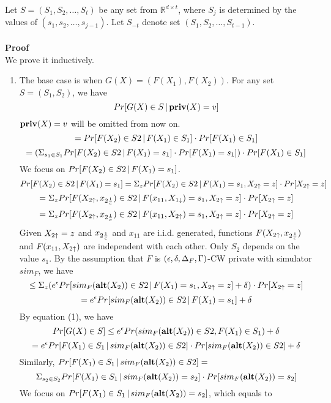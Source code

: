 \documentclass[11pt]{article}
\begin{document}
Let $S=(S_{1}, S_{2}, \dots, S_{t} )$ be any set from $\mathbb {R} ^{d \times t}$, where $S_{j}$ is determined by the values of $(s_{1}, s_{2} , \dots, s_{j-1})$. Let $S_{-t}$ denote set $(S_{1}, S_{2}, \dots, S_{t-1} )$.
\\
\\
{\bf Proof}\\
We prove it inductively. 
\begin{enumerate}
\item The base case is when $G(X) = (F(X_{1}) , F(X_{2}))$. For any set $S= (S_{1}, S_{2})$, we have
\[
Pr[G(X) \in S\,|\, {\bf priv}(X) = v ]
\]
${\bf priv}(X) =v$ will be omitted from now on.
\[
=Pr[F(X_{2}) \in S{2}\,|\, F(X_{1}) \in S_{1}] \cdot Pr[F(X_{1}) \in S_{1}]
\]
\begin{equation}
=(\Sigma_{s_{1} \in S_{1}} Pr[F(X_{2}) \in S{2}\,|\,  F(X_{1}) = s_{1}] \cdot Pr[F(X_{1}) = s_{1}])\cdot Pr[F(X_{1}) \in S_{1}]
\end{equation}
We focus on $Pr[F(X_{2}) \in S{2}\,|\,  F(X_{1}) = s_{1}] $.
\[
Pr[F(X_{2}) \in S{2}\,|\,  F(X_{1}) = s_{1}] = \Sigma_{z} Pr[F(X_{2}) \in S{2}\,|\,  F(X_{1}) = s_{1}, X_{2 \uparrow} =z] \cdot Pr [X_{2 \uparrow} = z]
\]
\[
= \Sigma_{z} Pr[F(X_{2 \uparrow}, x_{2 \frac{1}{c}}) \in S{2}\,|\, F(x_{11}, X_{1 \downarrow})=s_{1}, X_{2 \uparrow}=z] \cdot Pr [X_{2 \uparrow} = z]
\]
\[
= \Sigma_{z} Pr[F(X_{2 \uparrow}, x_{2 \frac{1}{c}}) \in S{2}\,|\, F(x_{11}, X_{2 \uparrow})=s_{1}, X_{2 \uparrow}=z] \cdot Pr [X_{2 \uparrow} = z]
\]
Given $X_{2 \uparrow}=z$ and $x_{2 \frac{1}{c}}$ and $x_{11}$ are i.i.d. generated, functions $F(X_{2 \uparrow}, x_{2 \frac{1}{c}})$ and $F(x_{11}, X_{2 \uparrow})$ are independent with each other. Only $S_{2}$ depends on the value $s_{1}$. By the assumption that $F$ is $(\epsilon, \delta, \Delta_{F}, \Gamma)$-CW private with simulator $sim_{F}$, we have
\[
\leq \Sigma_{z} (e^{\epsilon}  Pr[sim_{F}({\bf alt}(X_{2})) \in S{2}\,|\, F(X_{1})=s_{1}, X_{2 \uparrow}=z]+\delta) \cdot Pr [X_{2 \uparrow} = z]
\]
\[
=e^{\epsilon}  Pr[sim_{F}({\bf alt}(X_{2})) \in S{2}\,|\, F(X_{1})=s_{1}]+\delta
\]
By equation (1), we have
\[
Pr [G(X) \in S] \leq e^{\epsilon}  Pr({sim_{F}({\bf alt}(X_{2})) \in S{2}}, { F(X_{1}) \in S_{1}})+\delta
\]
\begin{equation}
=e^{\epsilon} Pr[ F(X_{1}) \in S_{1}\,|\,{sim_{F}({\bf alt}(X_{2})) \in S{2}}] \cdot Pr [{sim_{F}({\bf alt}(X_{2})) \in S{2}}] +\delta
\end{equation}
Similarly, $
Pr[ F(X_{1}) \in S_{1}\,|\,sim_{F}({\bf alt}(X_{2})) \in S{2}]=
$
\begin{equation}
\Sigma_{s_{2}\in S_{2}} Pr[ F(X_{1}) \in S_{1}\,|\,sim_{F}({\bf alt}(X_{2})) = s_{2}] \cdot Pr [sim_{F}({\bf alt}(X_{2})) = s_{2}]
\end{equation}
We focus on $Pr[ F(X_{1}) \in S_{1}\,|\,sim_{F}({\bf alt}(X_{2})) = s_{2}]$, which equals to

\end{enumerate}
\end{document}
